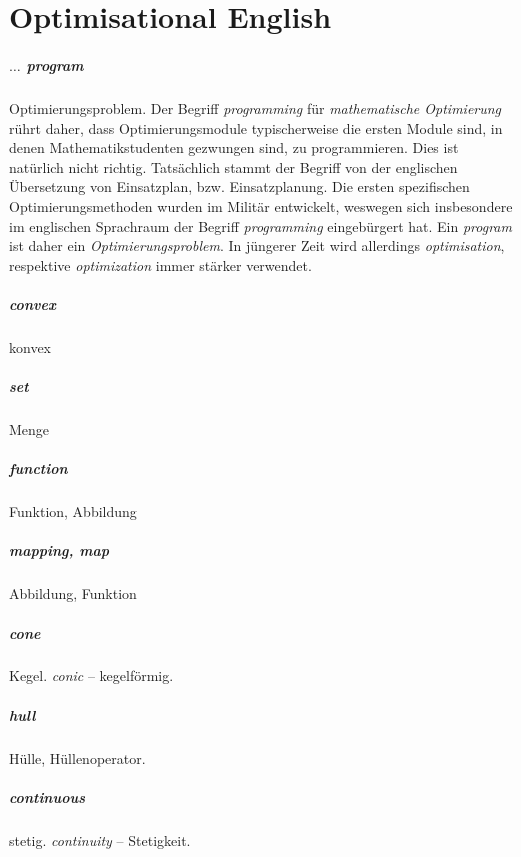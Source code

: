 \chapter{Optimisational English}

    \paragraph{$\ldots$ program}
    \label{par:program}
        Optimierungsproblem.
        Der Begriff \emph{programming} f\"ur \emph{mathematische Optimierung} r\"uhrt daher, dass Optimierungsmodule typischerweise die ersten Module sind, in denen Mathematikstudenten gezwungen sind, zu programmieren.
        Dies ist nat\"urlich nicht richtig.
        Tats\"achlich stammt der Begriff von der englischen \"Ubersetzung von Einsatzplan, bzw. Einsatzplanung.
        Die ersten spezifischen Optimierungsmethoden wurden im Milit\"ar entwickelt, weswegen sich insbesondere im englischen Sprachraum der Begriff \emph{programming} eingeb\"urgert hat.
        Ein \emph{program} ist daher ein \emph{Optimierungsproblem}.
        In j\"ungerer Zeit wird allerdings \emph{optimisation}, respektive \emph{optimization} immer st\"arker verwendet.

    \paragraph{convex}
    \label{par:conv}
        konvex

    \paragraph{set}
    \label{par:set}
        Menge

    \paragraph{function}
    \label{par:func}
        Funktion, Abbildung

    \paragraph{mapping, map}
    \label{par:map}
        Abbildung, Funktion

    \paragraph{cone}
    \label{par:cone}
        Kegel. \textsl{conic} -- kegelf\"ormig.

    \paragraph{hull}
    \label{par:hull}
        H\"ulle, H\"ullenoperator.

    \paragraph{continuous}
    \label{par:conti}
        stetig. \emph{continuity} -- Stetigkeit.